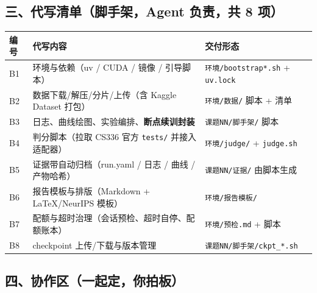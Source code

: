 \documentclass[
  chinese,
  11pt,
]{ctexart}
\newcounter{none} %
\begin{document}
\subsection{三、代写清单（脚手架，Agent 负责，共 8 项）}\label{ux4e09ux4ee3ux5199ux6e05ux5355ux811aux624bux67b6agent-ux8d1fux8d23ux5171-8-ux9879}

{\def\LTcaptype{none} %
\begin{longtable}[]{@{}
  >{\raggedright\arraybackslash}p{}
  >{\raggedright\arraybackslash}p{}
  >{\raggedright\arraybackslash}p{}@{}}
\toprule\noalign{}
\begin{minipage}[b]{\linewidth}\raggedright
编号
\end{minipage} & \begin{minipage}[b]{\linewidth}\raggedright
代写内容
\end{minipage} & \begin{minipage}[b]{\linewidth}\raggedright
交付形态
\end{minipage} \\
\midrule\noalign{}
\endhead
\bottomrule\noalign{}
\endlastfoot
B1 & 环境与依赖（uv / CUDA / 镜像 / 引导脚本） & \texttt{环境/bootstrap*.sh} + \texttt{uv.lock} \\
B2 & 数据下载/解压/分片/上传（含 Kaggle Dataset 打包） & \texttt{环境/数据/} 脚本 + 清单 \\
B3 & 日志、曲线绘图、实验编排、\textbf{断点续训封装} & \texttt{课题NN/脚手架/} 脚本 \\
B4 & 判分脚本（拉取 CS336 官方 \texttt{tests/} 并接入适配器） & \texttt{环境/judge/} + \texttt{judge.sh} \\
B5 & 证据带自动归档（run.yaml / 日志 / 曲线 / 产物哈希） & \texttt{课题NN/证据/} 由脚本生成 \\
B6 & 报告模板与排版（Markdown + LaTeX/NeurIPS 模板） & \texttt{环境/报告模板/} \\
B7 & 配额与超时治理（会话预检、超时自停、配额账本） & \texttt{环境/预检.md} + 脚本 \\
B8 & checkpoint 上传/下载与版本管理 & \texttt{课题NN/脚手架/ckpt\_*.sh} \\
\end{longtable}
}

\subsection{四、协作区（一起定，你拍板）}\label{ux56dbux534fux4f5cux533aux4e00ux8d77ux5b9aux4f60ux62cdux677f}
\end{document}
